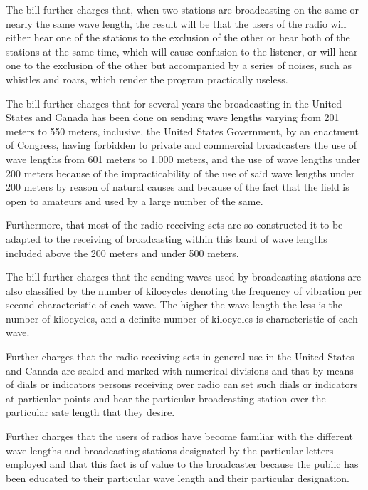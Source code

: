 The bill further charges that, when two stations are broadcasting on the same or
nearly the same wave length, the result will be that the users of the radio
will either hear one of the stations to the exclusion of the other or hear both
of the stations at the same time, which will cause confusion to the listener,
or will hear one to the exclusion of the other but accompanied by a series of
noises, such as whistles and roars, which render the program practically
useless.

The bill further charges that for several years the broadcasting in the United
States and Canada has been done on sending wave lengths varying from 201 meters
to 550 meters, inclusive, the United States Government, by an enactment of
Congress, having forbidden to private and commercial broadcasters the use of
wave lengths from 601 meters to 1.000 meters, and the use of wave
lengths under 200 meters because of the impracticability of the use of
said wave lengths under 200 meters by reason of natural causes and because of
the fact that the field is open to amateurs and used by a large number of the
same. 

Furthermore, that most of the radio receiving sets are so constructed it to be
adapted to the receiving of broadcasting within this band of wave lengths
included above the 200 meters and under 500 meters.

The bill further charges that the sending waves used by broadcasting stations
are also classified by the number of kilocycles denoting the frequency of
vibration per second characteristic of each wave. The higher the wave length
the less is the number of kilocycles, and a definite number of kilocycles is
characteristic of each wave.

Further charges that the radio receiving sets in general use in the United
States and Canada are scaled and marked with numerical divisions and that by
means of dials or indicators persons receiving over radio can set such dials or
indicators at particular points and hear the particular broadcasting station
over the particular sate length that they desire.

Further charges that the users of radios have become familiar with the different
wave lengths and broadcasting stations designated by the particular letters
employed and that this fact is of value to the broadcaster because the public
has been educated to their particular wave length and their
particular designation.

